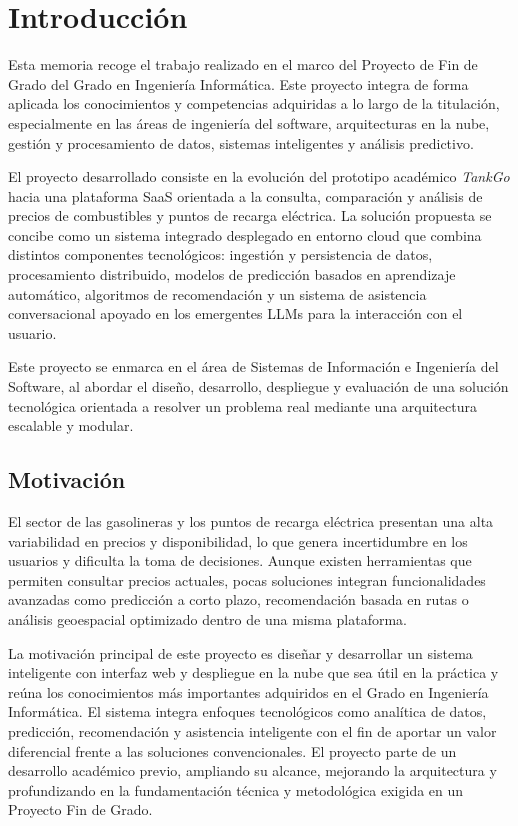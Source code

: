 \chapter{Introducción }
Esta memoria recoge el trabajo realizado en el marco del Proyecto de Fin de Grado del 
Grado en Ingeniería Informática. Este proyecto integra de forma aplicada los conocimientos 
y competencias adquiridas a lo largo de la titulación, especialmente en las áreas de 
ingeniería del software, arquitecturas en la nube, gestión y procesamiento de datos, 
sistemas inteligentes y análisis predictivo.

El proyecto desarrollado consiste en la evolución del prototipo académico 
\textit{TankGo} \cite{Alvis2025TankGo} hacia una plataforma SaaS \cite{nist2011} orientada 
a la consulta, comparación y análisis de precios de combustibles y puntos de recarga 
eléctrica. La solución propuesta se concibe como un sistema integrado desplegado en 
entorno cloud que combina distintos componentes tecnológicos: ingestión y persistencia 
de datos, procesamiento distribuido, modelos de predicción basados en aprendizaje 
automático, algoritmos de recomendación y un sistema de asistencia conversacional apoyado en los emergentes LLMs
para la interacción con el usuario.

Este proyecto se enmarca en el área de Sistemas de Información e Ingeniería del 
Software, al abordar el diseño, desarrollo, despliegue y evaluación de una solución 
tecnológica orientada a resolver un problema real mediante una arquitectura escalable 
y modular.

\section{Motivación}
El sector de las gasolineras y los puntos de recarga eléctrica presentan una alta 
variabilidad en precios y disponibilidad, lo que genera incertidumbre en los usuarios 
y dificulta la toma de decisiones. Aunque existen herramientas que permiten consultar 
precios actuales, pocas soluciones integran funcionalidades avanzadas como predicción 
a corto plazo, recomendación basada en rutas o análisis geoespacial optimizado dentro 
de una misma plataforma.

La motivación principal de este proyecto es diseñar y desarrollar un sistema inteligente
con interfaz web y despliegue en la nube que sea útil en la
práctica y reúna los conocimientos más importantes adquiridos en el Grado en
Ingeniería Informática. El sistema integra enfoques tecnológicos como analítica de
datos, predicción, recomendación y asistencia inteligente con el fin de aportar un
valor diferencial frente a las soluciones convencionales. El proyecto parte de un
desarrollo académico previo, ampliando su alcance, mejorando la arquitectura y
profundizando en la fundamentación técnica y metodológica exigida en un Proyecto
Fin de Grado.

